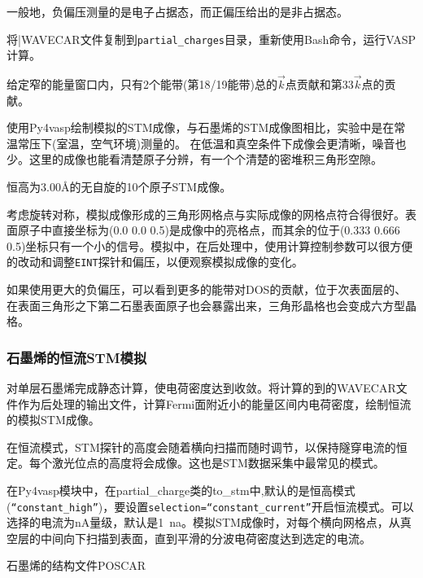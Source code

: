 一般地，负偏压测量的是电子占据态，而正偏压给出的是非占据态。

将|\textrm{WAVECAR}文件复制到\texttt{partial\_charges}目录，重新使用\textrm{Bash}命令，运行\textrm{VASP}计算。%

给定窄的能量窗口内，只有2个能带(第18/19能带)总的$\vec k$点贡献和第33$\vec k$点的贡献。

使用\textrm{Py4vasp}绘制模拟的\textrm{STM}成像，与石墨烯的\textrm{STM}成像图相比，实验中是在常温常压下(室温，空气环境)测量的。%
在低温和真空条件下成像会更清晰，噪音也少。这里的成像也能看清楚原子分辨，有一个个清楚的密堆积三角形空隙。

恒高为\textrm{3.00\AA}的无自旋的10个原子\textrm{STM}成像。

考虑旋转对称，模拟成像形成的三角形网格点与实际成像的网格点符合得很好。表面原子中直接坐标为(0.0 0.0 0.5)是成像中的亮格点，而其余的位于(0.333 0.666 0.5)坐标只有一个小的信号。模拟中，在后处理中，使用计算控制参数可以很方便的改动和调整\texttt{EINT}探针和偏压，以便观察模拟成像的变化。

如果使用更大的负偏压，可以看到更多的能带对\textrm{DOS}的贡献，位于次表面层的、在表面三角形之下第二石墨表面原子也会暴露出来，三角形晶格也会变成六方型晶格。

\subsubsection{石墨烯的恒流\rm{STM}模拟}
对单层石墨烯完成静态计算，使电荷密度达到收敛。将计算的到的\textrm{WAVECAR}文件作为后处理的输出文件，计算\textrm{Fermi}面附近小的能量区间内电荷密度，绘制恒流的模拟\textrm{STM}成像。

在恒流模式，\textrm{STM}探针的高度会随着横向扫描而随时调节，以保持隧穿电流的恒定。每个激光位点的高度将会成像。这也是\textrm{STM}数据采集中最常见的模式。

在\textrm{Py4vasp}模块中，在\textrm{partial\_charge}类的\textrm{to\_stm}中,默认的是恒高模式(\texttt{``constant\_high''})，要设置\texttt{selection=``constant\_current''}开启恒流模式。可以选择的电流为\textrm{nA}量级，默认是\textrm{1~na}。模拟\textrm{STM}成像时，对每个横向网格点，从真空层的中间向下扫描到表面，直到平滑的分波电荷密度达到选定的电流。

石墨烯的结构文件\textrm{POSCAR}

